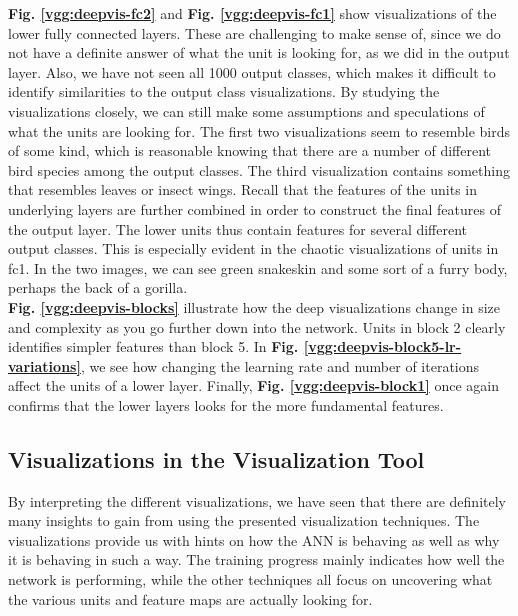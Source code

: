 \noindent \textbf{Fig. \ref{vgg:deepvis-fc2}} and \textbf{Fig. \ref{vgg:deepvis-fc1}} show visualizations of the lower fully connected layers. These are challenging to make sense of, since we do not have a definite answer of what the unit is looking for, as we did in the output layer. Also, we have not seen all 1000 output classes, which makes it difficult to identify similarities to the output class visualizations. By studying the visualizations closely, we can still make some assumptions and speculations of what the units are looking for. The first two visualizations seem to resemble birds of some kind, which is reasonable knowing that there are a number of different bird species among the output classes. The third visualization contains something that resembles leaves or insect wings. Recall that the features of the units in underlying layers are further combined in order to construct the final features of the output layer. The lower units thus contain features for several different output classes. This is especially evident in the chaotic visualizations of units in fc1. In the two images, we can see green snakeskin and some sort of a furry body, perhaps the back of a gorilla. \\ %

\noindent \textbf{Fig. \ref{vgg:deepvis-blocks}} illustrate how the deep visualizations change in size and complexity as you go further down into the network. Units in block 2 clearly identifies simpler features than block 5. In \textbf{Fig. \ref{vgg:deepvis-block5-lr-variations}}, we see how changing the learning rate and number of iterations affect the units of a lower layer. %
Finally, \textbf{Fig. \ref{vgg:deepvis-block1}} once again confirms that the lower layers looks for the more fundamental features.

\subsection{Visualizations in the Visualization Tool}

By interpreting the different visualizations, we have seen that there are definitely many insights to gain from using the presented visualization techniques. The visualizations provide us with hints on how the ANN is behaving as well as why it is behaving in such a way. The training progress mainly indicates how well the network is performing, while the other techniques all focus on uncovering what the various units and feature maps are actually looking for.

